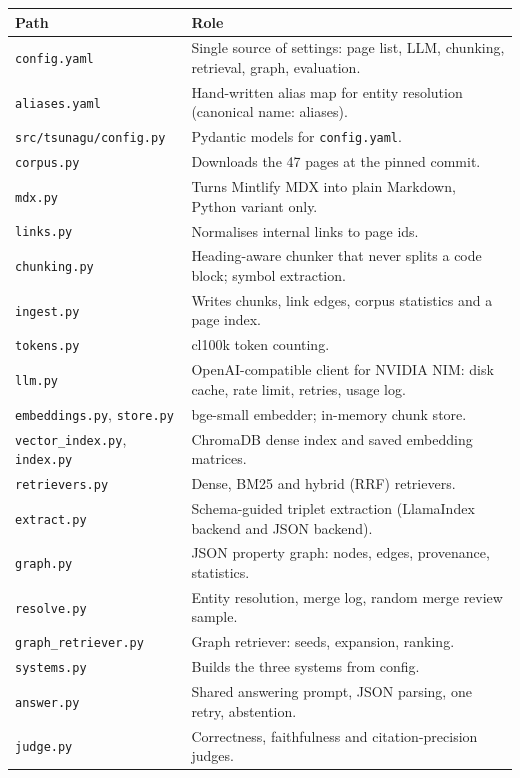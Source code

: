 \documentclass[11pt,a4paper]{article}
\newcommand{\code}[1]{\texttt{#1}}
\begin{document}
\begin{center}
\small
\begin{tabular}{p{4.6cm}p{10.4cm}}
\toprule
Path & Role \\
\midrule
\code{config.yaml} & Single source of settings: page list, LLM, chunking, retrieval, graph, evaluation. \\
\code{aliases.yaml} & Hand-written alias map for entity resolution (canonical name: aliases). \\
\code{src/tsunagu/config.py} & Pydantic models for \code{config.yaml}. \\
\code{corpus.py} & Downloads the 47 pages at the pinned commit. \\
\code{mdx.py} & Turns Mintlify MDX into plain Markdown, Python variant only. \\
\code{links.py} & Normalises internal links to page ids. \\
\code{chunking.py} & Heading-aware chunker that never splits a code block; symbol extraction. \\
\code{ingest.py} & Writes chunks, link edges, corpus statistics and a page index. \\
\code{tokens.py} & cl100k token counting. \\
\code{llm.py} & OpenAI-compatible client for NVIDIA NIM: disk cache, rate limit, retries, usage log. \\
\code{embeddings.py}, \code{store.py} & bge-small embedder; in-memory chunk store. \\
\code{vector\_index.py}, \code{index.py} & ChromaDB dense index and saved embedding matrices. \\
\code{retrievers.py} & Dense, BM25 and hybrid (RRF) retrievers. \\
\code{extract.py} & Schema-guided triplet extraction (LlamaIndex backend and JSON backend). \\
\code{graph.py} & JSON property graph: nodes, edges, provenance, statistics. \\
\code{resolve.py} & Entity resolution, merge log, random merge review sample. \\
\code{graph\_retriever.py} & Graph retriever: seeds, expansion, ranking. \\
\code{systems.py} & Builds the three systems from config. \\
\code{answer.py} & Shared answering prompt, JSON parsing, one retry, abstention. \\
\code{judge.py} & Correctness, faithfulness and citation-precision judges. \\

\end{tabular}
\end{center}
\end{document}
